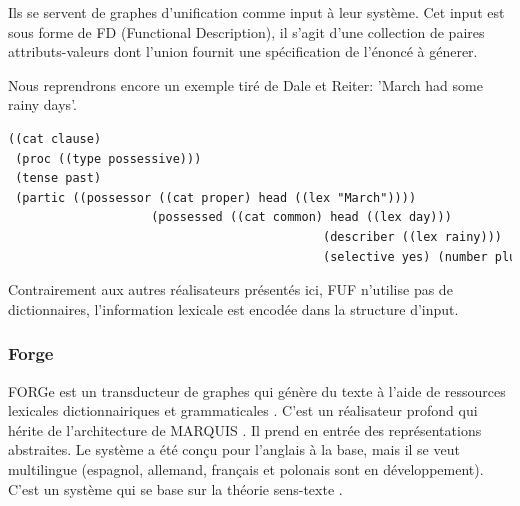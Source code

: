 
Ils se servent de graphes d'unification comme input à leur système. Cet input est sous forme de FD (Functional Description), il s'agit d'une collection de paires attributs-valeurs dont l'union fournit une spécification de l'énoncé à génerer.

Nous reprendrons encore un exemple tiré de Dale et Reiter: 'March had some rainy days'.
\begin{lstlisting}[language=Xml, caption=FD: input de Surge, label=surge]
((cat clause)
 (proc ((type possessive)))
 (tense past)
 (partic ((possessor ((cat proper) head ((lex "March"))))
					(possessed ((cat common) head ((lex day)))
											(describer ((lex rainy)))
											(selective yes) (number plural)))))
\end{lstlisting}

Contrairement aux autres réalisateurs présentés ici, FUF n'utilise pas de dictionnaires, l'information lexicale est encodée dans la structure d'input.

\subsubsection{Forge}
FORGe est un transducteur de graphes qui génère du texte à l'aide de ressources lexicales dictionnairiques et grammaticales \citep{MilledemoFORGePompeu2017}. C'est un réalisateur profond qui hérite de l'architecture de MARQUIS \citep{WannerMARQUISGENERATIONUSERTAILORED2010}.  Il prend en entrée des représentations abstraites. Le système a été conçu pour l'anglais à la base, mais il se veut multilingue (espagnol, allemand, français et polonais sont en développement). C'est un système qui se base sur la théorie sens-texte \citep{melcuk1988}.

